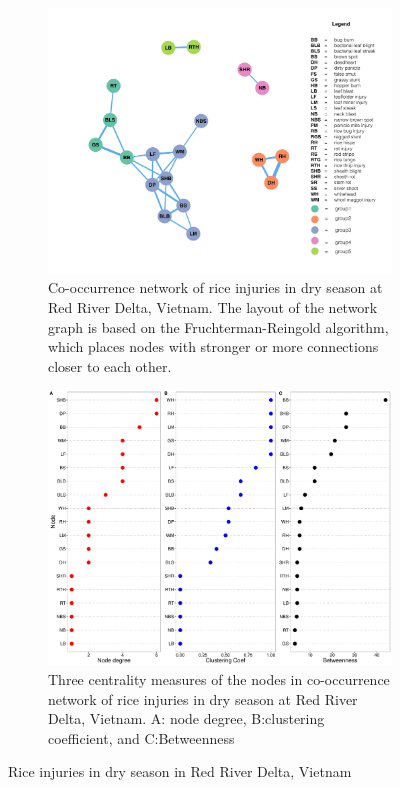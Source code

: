 \begin{figure}
    \centering
    \begin{subfigure}[b]{1\textwidth}
        \includegraphics[width = 1\textwidth]{figures/networkRR_ds/networkRR_ds.pdf}
        \caption{Co-occurrence network of rice injuries in dry season at Red River Delta, Vietnam. The layout of the network graph is based on the Fruchterman-Reingold algorithm, which places nodes with stronger or more connections closer to each other.}
        \label{fig:networkRR_ds}
    \end{subfigure}
    \begin{subfigure}[b]{1\textwidth}
        \includegraphics[width = 1\textwidth]{figures/nodepropRR_ds/nodepropRR_ds.pdf}
        \caption{Three centrality measures of the nodes in co-occurrence network of rice injuries in dry season at Red River Delta, Vietnam. A: node degree, B:clustering coefficient, and C:Betweenness}
        \label{fig:nodepropRR_ds}
    \end{subfigure}
    \caption{Rice injuries in dry season in Red River Delta, Vietnam }
    \label{fig:RR_ds}
\end{figure}

